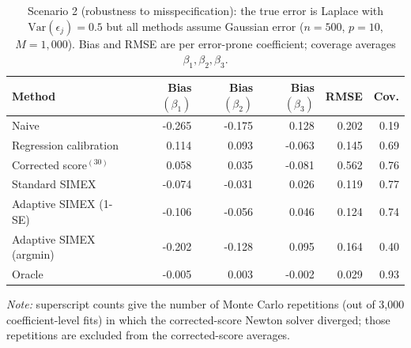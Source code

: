 \begin{table}[t]
\centering
\footnotesize
\caption{Scenario 2 (robustness to misspecification): the true
error is Laplace with $\mathrm{Var}(\epsilon_j)=0.5$ but all
methods assume Gaussian error ($n=500$, $p=10$, $M=1{,}000$).
Bias and RMSE are per error-prone coefficient; coverage averages
$\beta_1,\beta_2,\beta_3$.}
\label{tab:scenario2}
\begin{tabular}{l rrr r r}
\toprule
Method & Bias$(\beta_1)$ & Bias$(\beta_2)$ & Bias$(\beta_3)$ & RMSE & Cov. \\
\midrule
Naive & -0.265 & -0.175 & 0.128 & 0.202 & 0.19 \\
Regression calibration & 0.114 & 0.093 & -0.063 & 0.145 & 0.69 \\
Corrected score$^{(30)}$ & 0.058 & 0.035 & -0.081 & 0.562 & 0.76 \\
Standard SIMEX & -0.074 & -0.031 & 0.026 & 0.119 & 0.77 \\
Adaptive SIMEX (1-SE) & -0.106 & -0.056 & 0.046 & 0.124 & 0.74 \\
Adaptive SIMEX (argmin) & -0.202 & -0.128 & 0.095 & 0.164 & 0.40 \\
Oracle & -0.005 & 0.003 & -0.002 & 0.029 & 0.93 \\
\bottomrule
\end{tabular}
\vspace{2pt}
\par\footnotesize \emph{Note:} superscript counts give the
number of Monte Carlo repetitions (out of 3{,}000
coefficient-level fits) in which the corrected-score Newton
solver diverged; those repetitions are excluded from the
corrected-score averages.
\end{table}